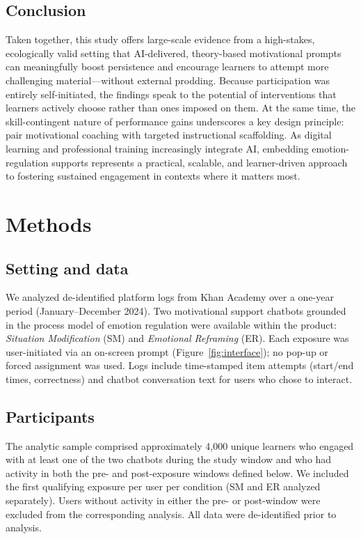 \documentclass[11pt]{report}
\begin{document}
\begin{mainf}
\subsection{Conclusion}
Taken together, this study offers large-scale evidence from a high-stakes, ecologically valid setting that AI-delivered, theory-based motivational prompts can meaningfully boost persistence and encourage learners to attempt more challenging material—without external prodding. 
Because participation was entirely self-initiated, the findings speak to the potential of interventions that learners actively choose rather than ones imposed on them. At the same time, the skill-contingent nature of performance gains underscores a key design principle: pair motivational coaching with targeted instructional scaffolding. 
As digital learning and professional training increasingly integrate AI, embedding emotion-regulation supports represents a practical, scalable, and learner-driven approach to fostering sustained engagement in contexts where it matters most.


\section{Methods}

\subsection{Setting and data}
We analyzed de-identified platform logs from Khan Academy over a one-year period (January–December 2024).
Two motivational support chatbots grounded in the process model of emotion regulation were available within the product: \emph{Situation Modification} (SM) and \emph{Emotional Reframing} (ER).
Each exposure was user-initiated via an on-screen prompt (Figure~\ref{fig:interface}); no pop-up or forced assignment was used.
Logs include time-stamped item attempts (start/end times, correctness) and chatbot conversation text for users who chose to interact.

\subsection{Participants}
The analytic sample comprised approximately 4{,}000 unique learners who engaged with at least one of the two chatbots during the study window and who had activity in both the pre- and post-exposure windows defined below.
We included the first qualifying exposure per user per condition (SM and ER analyzed separately).
Users without activity in either the pre- or post-window were excluded from the corresponding analysis.
All data were de-identified prior to analysis.


\end{mainf}
\end{document}
